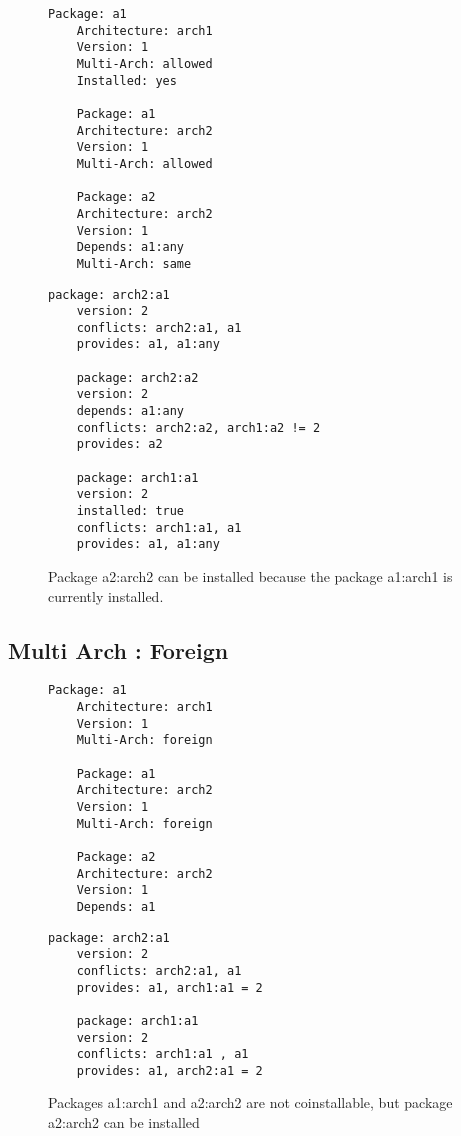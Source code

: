 \begin{figure}[h]
  \begin{minipage}[b]{0.45\linewidth}
    \begin{lstlisting}[style=debctrl]
    Package: a1
    Architecture: arch1
    Version: 1
    Multi-Arch: allowed
    Installed: yes

    Package: a1
    Architecture: arch2
    Version: 1
    Multi-Arch: allowed

    Package: a2
    Architecture: arch2
    Version: 1
    Depends: a1:any
    Multi-Arch: same
    \end{lstlisting}
  \end{minipage}
  \begin{minipage}[b]{0.45\linewidth}
    \begin{lstlisting}[style=cudf]
    package: arch2:a1
    version: 2
    conflicts: arch2:a1, a1
    provides: a1, a1:any

    package: arch2:a2
    version: 2
    depends: a1:any
    conflicts: arch2:a2, arch1:a2 != 2
    provides: a2

    package: arch1:a1
    version: 2
    installed: true
    conflicts: arch1:a1, a1
    provides: a1, a1:any
    \end{lstlisting}
  \end{minipage}

\caption{Package a2:arch2 can be installed because the package a1:arch1
is currently installed.}
\label{fig:arch-allowed}
\end{figure}

\subsection{Multi Arch : Foreign}

\begin{figure}[h]
  \begin{minipage}[b]{0.45\linewidth}
    \begin{lstlisting}[style=debctrl]
    Package: a1
    Architecture: arch1
    Version: 1
    Multi-Arch: foreign

    Package: a1
    Architecture: arch2
    Version: 1
    Multi-Arch: foreign

    Package: a2
    Architecture: arch2
    Version: 1
    Depends: a1
    \end{lstlisting}
  \end{minipage}
  \begin{minipage}[b]{0.45\linewidth}
    \begin{lstlisting}[style=cudf]
    package: arch2:a1
    version: 2
    conflicts: arch2:a1, a1
    provides: a1, arch1:a1 = 2

    package: arch1:a1
    version: 2
    conflicts: arch1:a1 , a1
    provides: a1, arch2:a1 = 2
    \end{lstlisting}
  \end{minipage}
\caption{Packages a1:arch1 and a2:arch2 are not coinstallable, but
package a2:arch2 can be installed}
\label{fig:arch-foreign}
\end{figure}

